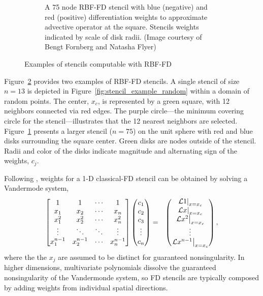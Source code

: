 \documentclass[11pt]{report}
\begin{document}
{\begin{figure}[htbp]
\begin{subfigure}[m]{0.35\textwidth}
		\caption{A 75 node RBF-FD stencil with blue (negative) and red (positive) differentiation weights to approximate advective operator at the square. Stencils weights indicated by scale of disk radii. (Image courtesy of Bengt Fornberg and Natasha Flyer)}
		\label{fig:stencil_example_sphere}
	\end{subfigure}
	\caption{Examples of stencils computable with RBF-FD}
	\label{fig:stencil_example}
\end{figure}

Figure~\ref{fig:stencil_example} provides two examples of RBF-FD stencils. A single stencil of size $n=13$ is depicted in Figure~\ref{fig:stencil_example_random} within a domain of random points. The center, $x_c$, is represented by a green square, with 12 neighbors connected via red edges. The purple circle---the minimum covering circle for the stencil---illustrates that the 12 nearest neighbors are selected. Figure~\ref{fig:stencil_example_sphere} presents a larger stencil ($n=75$) on the unit sphere with red and blue disks surrounding the square center. Green disks are nodes outside of the stencil. Radii and color of the disks indicate magnitude and alternating sign of the weights, $c_j$.

Following \cite{FornbergLehto11}, weights for a 1-D classical-FD stencil can be obtained by solving a Vandermode system,
	\begin{eqnarray}        
          \begin{bmatrix} 1 & 1 & \cdots & 1 \\ 
            x_1 & x_2 & \cdots & x_n \\ 
            x_1^2 & x_2^2 & \cdots & x_n^2 \\
            \vdots & \ddots & \ddots & \vdots \\ 
            x_1^{n-1} & x_2^{n-1} & \cdots & x_n^{n-1} \end{bmatrix} 
            \begin{pmatrix} c_1 \\ c_2 \\ c_3 \\ \vdots \\ c_n \end{pmatrix} & = & \begin{pmatrix} \left.\mathcal{L}1\right|_{x=x_c} \\  \left.\mathcal{L}x\right|_{x=x_c} \\  \left.\mathcal{L}x^2\right|_{x=x_c} \\ \vdots \\  \left.\mathcal{L}x^{n-1}\right|_{x=x_c} \end{pmatrix} \label{eq:classical_fd_weight_system} ,	\end{eqnarray}	
where the the $x_j$ are assumed to be distinct for guaranteed nonsingularity. In higher dimensions, multivariate polynomials dissolve the guaranteed nonsingularity of the Vandermonde system, so FD stencils are typically composed by adding weights from individual spatial directions. 

}
\end{document}
